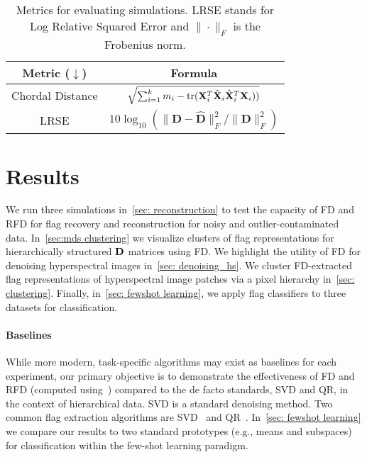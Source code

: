 \begin{table}[t]
\caption{Metrics for evaluating simulations. LRSE stands for Log Relative Squared Error and $\|\cdot\|_F$ is the Frobenius norm.}
    \label{tab:metrics}
    \centering
    \begin{tabular}{c|c}
       \toprule
       Metric ($\downarrow$) & Formula\\
       \midrule
       \midrule
       Chordal Distance & $\sqrt{\sum_{i=1}^k m_i - \mathrm{tr}(\mathbf{X}_i^T \hat{\mathbf{X}}_i\hat{\mathbf{X}}_i^T\mathbf{X}_i))}$ \\
       LRSE & $10 \log_{10} \left(\|\mathbf{D} - \hat{\mathbf{D}}\|_F^2/\|\mathbf{D}\|_F^2\right)$\\
       \bottomrule
    \end{tabular}
\end{table}
\vspace{-1mm}
\section{Results}\label{sec:results}
We run three simulations in~\cref{sec: reconstruction} to test the capacity of FD and RFD for flag recovery and reconstruction for noisy and outlier-contaminated data. In~\cref{sec:mds clustering} we visualize clusters of flag representations for hierarchically structured $\mathbf{D}$ matrices using FD. We highlight the utility of FD for denoising hyperspectral images in~\cref{sec: denoising_hs}. We cluster FD-extracted flag representations of hyperspectral image patches via a pixel hierarchy in~\cref{sec: clustering}. Finally, in~\cref{sec: fewshot learning}, we apply flag classifiers to three datasets for classification.

\paragraph{Baselines}
While more modern, task-specific algorithms may exist as baselines for each experiment, our primary objective is to demonstrate the effectiveness of FD and RFD (computed using~\algname) compared to the de facto standards, SVD and QR, in the context of hierarchical data. SVD is a standard denoising method. Two common flag extraction algorithms are SVD~\cite{draper2014flag,mankovich2022flag,Mankovich_2023_ICCV,szwagier2024curseisotropyprincipalcomponents} and QR~\cite{Mankovich_2023_ICCV}. In~\cref{sec: fewshot learning} we compare our results to two standard prototypes (e.g., means and subspaces) for classification within the few-shot learning paradigm.

